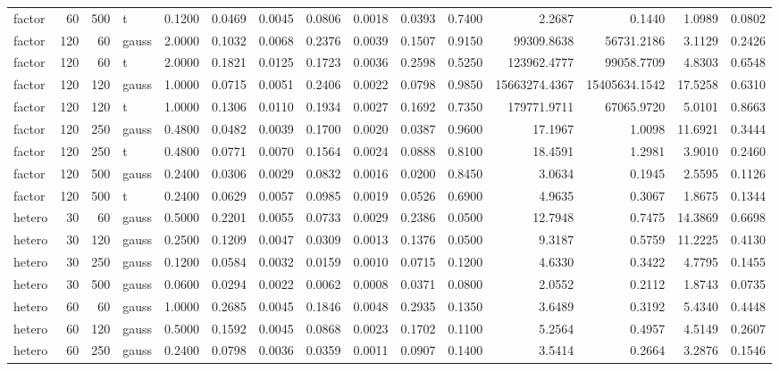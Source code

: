 \begin{tabular}{lrrlrrrrrrrrrrr}
factor & 60 & 500 & t & 0.1200 & 0.0469 & 0.0045 & 0.0806 & 0.0018 & 0.0393 & 0.7400 & 2.2687 & 0.1440 & 1.0989 & 0.0802 \\
factor & 120 & 60 & gauss & 2.0000 & 0.1032 & 0.0068 & 0.2376 & 0.0039 & 0.1507 & 0.9150 & 99309.8638 & 56731.2186 & 3.1129 & 0.2426 \\
factor & 120 & 60 & t & 2.0000 & 0.1821 & 0.0125 & 0.1723 & 0.0036 & 0.2598 & 0.5250 & 123962.4777 & 99058.7709 & 4.8303 & 0.6548 \\
factor & 120 & 120 & gauss & 1.0000 & 0.0715 & 0.0051 & 0.2406 & 0.0022 & 0.0798 & 0.9850 & 15663274.4367 & 15405634.1542 & 17.5258 & 0.6310 \\
factor & 120 & 120 & t & 1.0000 & 0.1306 & 0.0110 & 0.1934 & 0.0027 & 0.1692 & 0.7350 & 179771.9711 & 67065.9720 & 5.0101 & 0.8663 \\
factor & 120 & 250 & gauss & 0.4800 & 0.0482 & 0.0039 & 0.1700 & 0.0020 & 0.0387 & 0.9600 & 17.1967 & 1.0098 & 11.6921 & 0.3444 \\
factor & 120 & 250 & t & 0.4800 & 0.0771 & 0.0070 & 0.1564 & 0.0024 & 0.0888 & 0.8100 & 18.4591 & 1.2981 & 3.9010 & 0.2460 \\
factor & 120 & 500 & gauss & 0.2400 & 0.0306 & 0.0029 & 0.0832 & 0.0016 & 0.0200 & 0.8450 & 3.0634 & 0.1945 & 2.5595 & 0.1126 \\
factor & 120 & 500 & t & 0.2400 & 0.0629 & 0.0057 & 0.0985 & 0.0019 & 0.0526 & 0.6900 & 4.9635 & 0.3067 & 1.8675 & 0.1344 \\
hetero & 30 & 60 & gauss & 0.5000 & 0.2201 & 0.0055 & 0.0733 & 0.0029 & 0.2386 & 0.0500 & 12.7948 & 0.7475 & 14.3869 & 0.6698 \\
hetero & 30 & 120 & gauss & 0.2500 & 0.1209 & 0.0047 & 0.0309 & 0.0013 & 0.1376 & 0.0500 & 9.3187 & 0.5759 & 11.2225 & 0.4130 \\
hetero & 30 & 250 & gauss & 0.1200 & 0.0584 & 0.0032 & 0.0159 & 0.0010 & 0.0715 & 0.1200 & 4.6330 & 0.3422 & 4.7795 & 0.1455 \\
hetero & 30 & 500 & gauss & 0.0600 & 0.0294 & 0.0022 & 0.0062 & 0.0008 & 0.0371 & 0.0800 & 2.0552 & 0.2112 & 1.8743 & 0.0735 \\
hetero & 60 & 60 & gauss & 1.0000 & 0.2685 & 0.0045 & 0.1846 & 0.0048 & 0.2935 & 0.1350 & 3.6489 & 0.3192 & 5.4340 & 0.4448 \\
hetero & 60 & 120 & gauss & 0.5000 & 0.1592 & 0.0045 & 0.0868 & 0.0023 & 0.1702 & 0.1100 & 5.2564 & 0.4957 & 4.5149 & 0.2607 \\
hetero & 60 & 250 & gauss & 0.2400 & 0.0798 & 0.0036 & 0.0359 & 0.0011 & 0.0907 & 0.1400 & 3.5414 & 0.2664 & 3.2876 & 0.1546 \\

\end{tabular}
